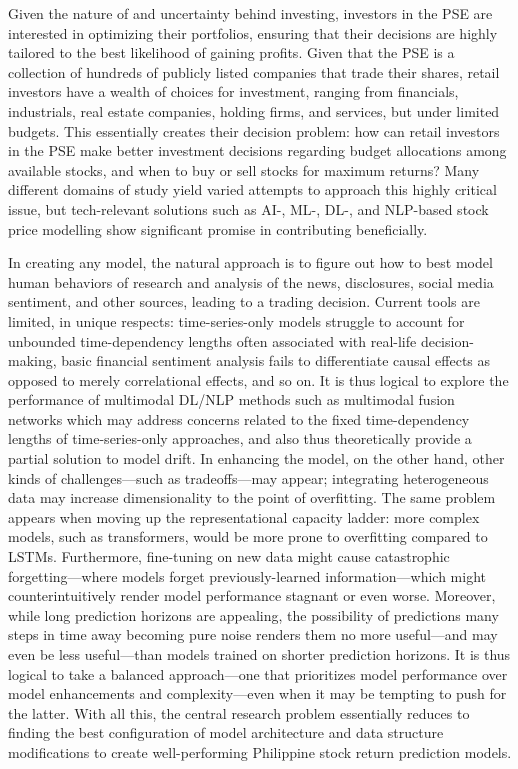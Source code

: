 \documentclass[stu,floatsintext]{apa7}
\begin{document}
Given the nature of and uncertainty behind investing, investors in the PSE are interested in optimizing their portfolios, ensuring that their decisions are highly tailored to the best likelihood of gaining profits. Given that the PSE is a collection of hundreds of publicly listed companies that trade their shares, retail investors have a wealth of choices for investment, ranging from financials, industrials, real estate companies, holding firms, and services, but under limited budgets. This essentially creates their decision problem: how can retail investors in the PSE make better investment decisions regarding budget allocations among available stocks, and when to buy or sell stocks for maximum returns? Many different domains of study yield varied attempts to approach this highly critical issue, but tech-relevant solutions such as AI-, ML-, DL-, and NLP-based stock price modelling show significant promise in contributing beneficially.

In creating any model, the natural approach is to figure out how to best model human behaviors of research and analysis of the news, disclosures, social media sentiment, and other sources, leading to a trading decision. Current tools are limited, in unique respects: time-series-only models struggle to account for unbounded time-dependency lengths often associated with real-life decision-making, basic financial sentiment analysis fails to differentiate causal effects as opposed to merely correlational effects, and so on. It is thus logical to explore the performance of multimodal DL/NLP methods such as multimodal fusion networks which may address concerns related to the fixed time-dependency lengths of time-series-only approaches, and also thus theoretically provide a partial solution to model drift. In enhancing the model, on the other hand, other kinds of challenges—such as tradeoffs—may appear; integrating heterogeneous data may increase dimensionality to the point of overfitting. The same problem appears when moving up the representational capacity ladder: more complex models, such as transformers, would be more prone to overfitting compared to LSTMs. Furthermore, fine-tuning on new data might cause catastrophic forgetting—where models forget previously-learned information—which might counterintuitively render model performance stagnant or even worse. Moreover, while long prediction horizons are appealing, the possibility of predictions many steps in time away becoming pure noise renders them no more useful—and may even be less useful—than models trained on shorter prediction horizons. It is thus logical to take a balanced approach—one that prioritizes model performance over model enhancements and complexity—even when it may be tempting to push for the latter.  With all this, the central research problem essentially reduces to finding the best configuration of model architecture and data structure modifications to create well-performing Philippine stock return prediction models.
\end{document}
